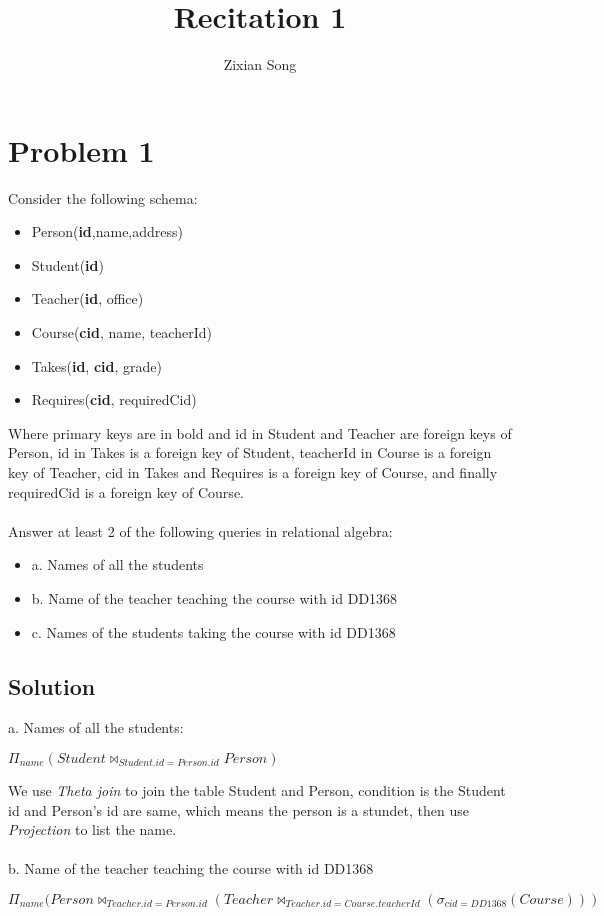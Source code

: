 \documentclass[a4paper]{article}
\title{Recitation 1}
\author{Zixian Song}
\begin{document}
\maketitle


\section{Problem 1}
Consider the following schema:
\begin{itemize}
    \item Person(\textbf{id},name,address)
    \item Student(\textbf{id})
    \item Teacher(\textbf{id}, office)
    \item Course(\textbf{cid}, name, teacherId)
    \item Takes(\textbf{id}, \textbf{cid}, grade)
    \item Requires(\textbf{cid}, requiredCid)
\end{itemize}
Where primary keys are in bold and id in Student and Teacher are foreign keys of Person, id in Takes is a foreign key of Student, teacherId in Course is a foreign key of Teacher, cid in Takes and Requires is a foreign key of Course, and finally requiredCid is a foreign key of Course.
\\ \\
Answer at least 2 of the following queries in relational algebra:
\begin{itemize}
    \item a. Names of all the students
    \item b. Name of the teacher teaching the course with id DD1368
    \item c. Names of the students taking the course with id DD1368
\end{itemize}
\newpage 
\subsection{Solution}
a. Names of all the students:
    \begin{center}
        $\Pi_{name}(Student \bowtie_{Student.id = Person.id} Person) $
    \end{center}
We use \textit{Theta join} to join the table Student and Person,
   condition is the Student id and Person's id are same, which means the person is a stundet, then use \textit{Projection} to list the name.
\\ \\
b. Name of the teacher teaching the course with id DD1368
    \begin{center}
    $\Pi_{name}(Person \bowtie_{Teacher.id = Person.id} (Teacher \bowtie_{Teacher.id = Course.teacherId}(\sigma_{cid=DD1368}(Course))) $
    \end{center}
\end{document}
